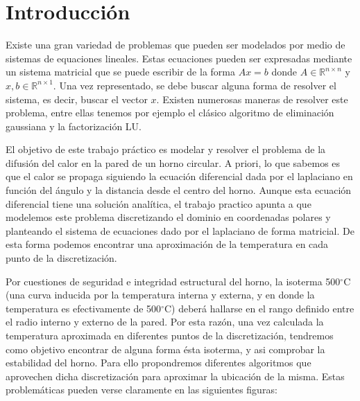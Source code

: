 \section{Introducción}

Existe una gran variedad de problemas que pueden ser modelados por medio de sistemas de equaciones lineales. Estas ecuaciones pueden ser expresadas mediante un sistema matricial que se puede escribir de la forma $Ax = b$ donde $A \in \mathbb{R}^{n \times n}$ y $x,b \in \mathbb{R}^{n \times 1}$. Una vez representado, se debe buscar alguna forma de resolver el sistema, es decir, buscar el vector $x$. Existen numerosas maneras de resolver este problema, entre ellas tenemos por ejemplo el clásico algoritmo de eliminación gaussiana y la factorización LU.

El objetivo de este trabajo práctico es modelar y resolver el problema de la difusión del calor en la pared de un horno circular. A priori, lo que sabemos es que el calor se propaga siguiendo la ecuación diferencial dada por el laplaciano en función del ángulo y la distancia desde el centro del horno. Aunque esta ecuación diferencial tiene una solución analítica, el trabajo practico apunta a que modelemos este problema discretizando el dominio en coordenadas polares y planteando el sistema de ecuaciones dado por el laplaciano de forma matricial. De esta forma podemos encontrar una aproximación de la temperatura en cada punto de la discretización.

Por cuestiones de seguridad e integridad estructural del horno, la isoterma 500$^{\circ}$C (una curva inducida por la temperatura interna y externa, y en donde la temperatura es efectivamente de 500$^{\circ}$C) deberá hallarse en el rango definido entre el radio interno y externo de la pared. Por esta razón, una vez calculada la temperatura aproximada en diferentes puntos de la discretización, tendremos como objetivo encontrar de alguna forma ésta isoterma, y asi comprobar la estabilidad del horno. Para ello propondremos diferentes algoritmos que aprovechen dicha discretización para aproximar la ubicación de la misma. Estas problemáticas pueden verse claramente en las siguientes figuras:

